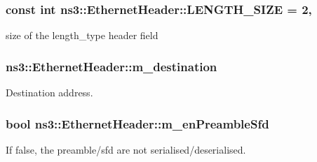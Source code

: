 \subsubsection[{\texorpdfstring{L\+E\+N\+G\+T\+H\+\_\+\+S\+I\+ZE}{LENGTH_SIZE}}]{\setlength{\rightskip}{0pt plus 5cm}const int ns3\+::\+Ethernet\+Header\+::\+L\+E\+N\+G\+T\+H\+\_\+\+S\+I\+ZE = 2\hspace{0.3cm}{\ttfamily [static]}, {\ttfamily [private]}}\hypertarget{classns3_1_1EthernetHeader_ad8f3307209ad16991395e9e7a50da27a}{}\label{classns3_1_1EthernetHeader_ad8f3307209ad16991395e9e7a50da27a}


size of the length\+\_\+type header field 

\subsubsection[{\texorpdfstring{m\+\_\+destination}{m_destination}}]{ ns3\+::\+Ethernet\+Header\+::m\+\_\+destination\hspace{0.3cm}{\ttfamily [private]}}\hypertarget{classns3_1_1EthernetHeader_a2f9cc867b3e38081e05fe7f0dc0cadd1}{}\label{classns3_1_1EthernetHeader_a2f9cc867b3e38081e05fe7f0dc0cadd1}


Destination address. 

\subsubsection[{\texorpdfstring{m\+\_\+en\+Preamble\+Sfd}{m_enPreambleSfd}}]{\setlength{\rightskip}{0pt plus 5cm}bool ns3\+::\+Ethernet\+Header\+::m\+\_\+en\+Preamble\+Sfd\hspace{0.3cm}{\ttfamily [private]}}\hypertarget{classns3_1_1EthernetHeader_a1dfe391d5fce575ed46be576035b5523}{}\label{classns3_1_1EthernetHeader_a1dfe391d5fce575ed46be576035b5523}
If false, the preamble/sfd are not serialised/deserialised. 
